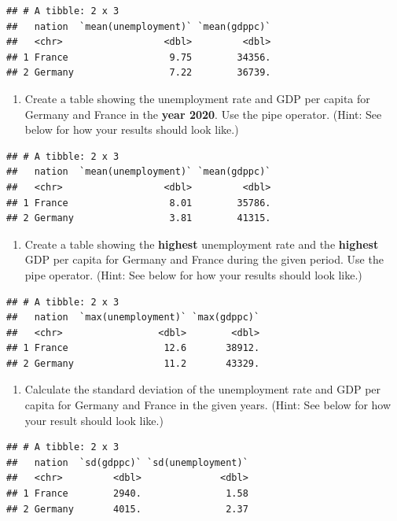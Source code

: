 \documentclass[
  12pt,
  oneside]{book}
\providecommand{\tightlist}{%
  \setlength{\itemsep}{0pt}\setlength{\parskip}{0pt}}
\theoremstyle{definition}
\theoremstyle{definition}
\theoremstyle{definition}
\theoremstyle{definition}
\theoremstyle{remark}
\begin{document}
\begin{verbatim}
## # A tibble: 2 x 3
##   nation  `mean(unemployment)` `mean(gdppc)`
##   <chr>                  <dbl>         <dbl>
## 1 France                  9.75        34356.
## 2 Germany                 7.22        36739.
\end{verbatim}

\begin{enumerate}
\def\labelenumi{(\arabic{enumi})}
\setcounter{enumi}{15}
\tightlist
\item
  Create a table showing the unemployment rate and GDP per capita for Germany
  and France in the \textbf{year 2020}. Use the pipe operator. (Hint: See below for how your results should
  look like.)
\end{enumerate}

\begin{verbatim}
## # A tibble: 2 x 3
##   nation  `mean(unemployment)` `mean(gdppc)`
##   <chr>                  <dbl>         <dbl>
## 1 France                  8.01        35786.
## 2 Germany                 3.81        41315.
\end{verbatim}

\begin{enumerate}
\def\labelenumi{(\arabic{enumi})}
\setcounter{enumi}{16}
\tightlist
\item
  Create a table showing the \textbf{highest} unemployment rate and the \textbf{highest}
  GDP per capita for Germany and France during the given period.
  Use the pipe operator. (Hint: See below for how your results should look like.)
\end{enumerate}

\begin{verbatim}
## # A tibble: 2 x 3
##   nation  `max(unemployment)` `max(gdppc)`
##   <chr>                 <dbl>        <dbl>
## 1 France                 12.6       38912.
## 2 Germany                11.2       43329.
\end{verbatim}

\begin{enumerate}
\def\labelenumi{(\arabic{enumi})}
\setcounter{enumi}{17}
\tightlist
\item
  Calculate the standard deviation of the unemployment rate and GDP per capita for Germany
  and France in the given years. (Hint: See below for how your result should
  look like.)
\end{enumerate}

\begin{verbatim}
## # A tibble: 2 x 3
##   nation  `sd(gdppc)` `sd(unemployment)`
##   <chr>         <dbl>              <dbl>
## 1 France        2940.               1.58
## 2 Germany       4015.               2.37
\end{verbatim}
\end{document}
